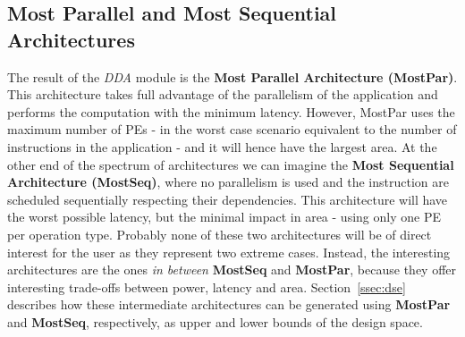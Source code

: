 \subsection{Most Parallel and Most Sequential Architectures}
\vspace{-1mm}
The result of the \textit{DDA} module is the \textbf{Most Parallel Architecture (MostPar)}. This architecture takes full advantage of the parallelism of the application and performs the computation with the minimum latency. However, MostPar uses the maximum number of PEs - in the worst case scenario equivalent to the number of instructions in the application - and it will hence have the largest area.
At the other end of the spectrum of architectures we can imagine the \textbf{Most Sequential Architecture (MostSeq)}, where no parallelism is used and the instruction are scheduled sequentially respecting their dependencies. This architecture will have the worst possible latency, but the minimal impact in area - using only one PE per operation type.
Probably none of these two architectures will be of direct interest for the user as they represent two extreme cases. Instead, the interesting architectures are the ones \textit{in between} \textbf{MostSeq} and \textbf{MostPar}, because they offer interesting trade-offs between power, latency and area. Section~\ref{ssec:dse} describes how these intermediate architectures can be generated using \textbf{MostPar} and \textbf{MostSeq}, respectively, as upper and lower bounds of the design space.

